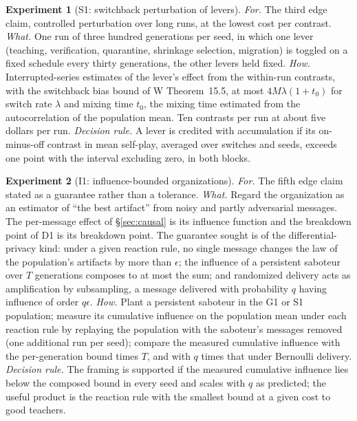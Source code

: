 \documentclass[11pt]{article}
\numberwithin{theorem}{section}
\theoremstyle{definition}
\theoremstyle{problemstyle}
\newtheorem{experiment}{Experiment}[section]
\begin{document}
\begin{experiment}[S1: switchback perturbation of levers]\label{exp:s1}
\emph{For.} The third edge claim, controlled perturbation over long runs, at the lowest cost per contrast.
\emph{What.} One run of three hundred generations per seed, in which one lever (teaching, verification, quarantine,
shrinkage selection, migration) is toggled on a fixed schedule every thirty generations, the other levers held fixed.
\emph{How.} Interrupted-series estimates of the lever's effect from the within-run contrasts, with the switchback bias
bound of W Theorem~15.5, at most $4M\lambda(1+t_0)$ for switch rate $\lambda$ and mixing time $t_0$, the mixing time
estimated from the autocorrelation of the population mean. Ten contrasts per run at about five dollars per run.
\emph{Decision rule.} A lever is credited with accumulation if its on-minus-off contrast in mean self-play, averaged
over switches and seeds, exceeds one point with the interval excluding zero, in both blocks.
\end{experiment}

\begin{experiment}[I1: influence-bounded organizations]\label{exp:i1}
\emph{For.} The fifth edge claim stated as a guarantee rather than a tolerance.
\emph{What.} Regard the organization as an estimator of ``the best artifact'' from noisy and partly adversarial
messages. The per-message effect of \S\ref{sec:causal} is its influence function and the breakdown point of D1 is
its breakdown point. The guarantee sought is of the differential-privacy kind: under a given reaction rule, no single
message changes the law of the population's artifacts by more than $\epsilon$; the influence of a persistent saboteur
over $T$ generations composes to at most the sum; and randomized delivery acts as amplification by subsampling, a
message delivered with probability $q$ having influence of order $q\epsilon$.
\emph{How.} Plant a persistent saboteur in the G1 or S1 population; measure its cumulative influence on the population
mean under each reaction rule by replaying the population with the saboteur's messages removed (one additional run per
seed); compare the measured cumulative influence with the per-generation bound times $T$, and with $q$ times that under
Bernoulli delivery.
\emph{Decision rule.} The framing is supported if the measured cumulative influence lies below the composed bound in
every seed and scales with $q$ as predicted; the useful product is the reaction rule with the smallest bound at a
given cost to good teachers.
\end{experiment}
\end{document}
